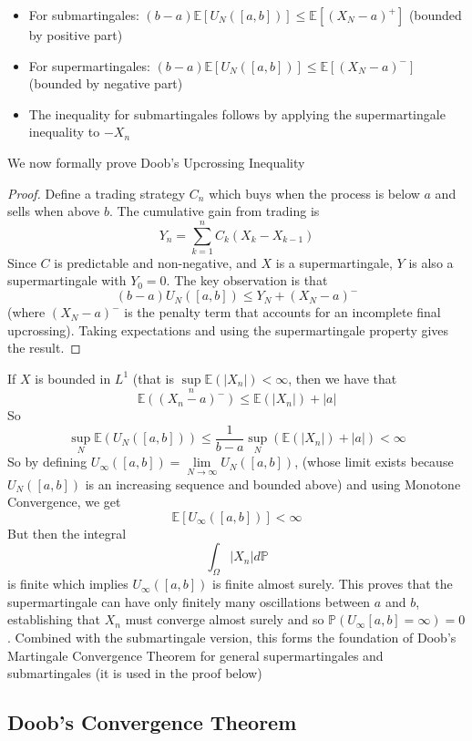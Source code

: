 \documentclass[11pt,a4paper]{article}
\theoremstyle{definition}
\begin{document}
\begin{itemize}
\item For submartingales: $(b-a) \mathbb{E}[U_N([a,b])] \leq \mathbb{E}[(X_N - a)^+]$ (bounded by positive part)
\item For supermartingales: $(b-a) \mathbb{E}[U_N([a,b])] \leq \mathbb{E}[(X_N - a)^-]$ (bounded by negative part)
\item The inequality for submartingales follows by applying the supermartingale inequality to $-X_n$
\end{itemize}
\noindent We now formally prove Doob's Upcrossing Inequality
\begin{proof}
Define a trading strategy $C_n$ which buys when the process is below $a$ and sells when above $b$. The cumulative gain from trading is
\[
Y_n = \sum_{k=1}^n C_k (X_k - X_{k-1})
\]
Since $C$ is predictable and non-negative, and $X$ is a supermartingale, $Y$ is also a supermartingale with $Y_0 = 0$. The key observation is that
\[
(b-a) U_N([a,b]) \leq Y_N + (X_N - a)^-
\]
(where $(X_N - a)^-$ is the penalty term that accounts for an incomplete final upcrossing). Taking expectations and using the supermartingale property gives the result.
\end{proof}
\noindent If $X$ is bounded in $L^1$ (that is $\sup \limits _n \mathbb{E}(|X_n|) < \infty$, then we have that \[
\mathbb{E}((X_n - a)^-) \le \mathbb{E}(|X_n|) + |a|
\]
So \[
\sup \limits _{N} \mathbb{E} (U_N([a,b])) \le \frac{1}{b-a} \sup _N (\mathbb{E}(|X_n|) + |a|) < \infty
\]
So by defining $U_\infty ([a,b]) = \lim \limits _{N \to \infty }U_N([a,b])$, (whose limit exists because $U_N([a,b])$ is an increasing sequence and bounded above) and using Monotone Convergence, we get
\[
\mathbb{E}[U_\infty([a,b])] < \infty
\]
But then the integral \[
\int _\Omega |X_n| d\mathbb{P}
\]
is finite which implies $U_\infty ([a,b])$ is finite almost surely. This proves that the supermartingale can have only finitely many oscillations between $a$ and $b$, establishing that $X_n$ must converge almost surely and so $\mathbb{P}(U_{\infty} [a,b] = \infty) = 0$. Combined with the submartingale version, this forms the foundation of Doob's Martingale Convergence Theorem for general supermartingales and submartingales (it is used in the proof below)



\subsection{Doob's Convergence Theorem}
\end{document}
